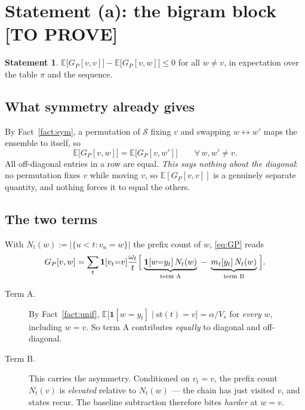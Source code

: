 \documentclass[11pt,a4paper]{article}
\theoremstyle{plain}
\theoremstyle{definition}
\newtheorem{statement}{Statement}
\newcommand{\TODO}{\textcolor{BrickRed}{\textbf{[TO PROVE]}}}
\newcommand{\Sig}{\mathcal{S}}
\newcommand{\1}{\mathbf{1}}
\newcommand{\E}{\mathbb{E}}
\begin{document}
\section{Statement (a): the bigram block \quad \TODO}\label{sec:a}

\begin{statement}\label{st:a}
$\E\bigl[G_P[v,v]\bigr]-\E\bigl[G_P[v,w]\bigr]\le 0$ for all $w\ne v$, in expectation over the
table $\pi$ and the sequence.
\end{statement}

\subsection{What symmetry already gives}

By Fact~\ref{fact:sym}, a permutation of $\Sig$ fixing $v$ and swapping $w\leftrightarrow w'$ maps
the ensemble to itself, so
\begin{equation}
\E\bigl[G_P[v,w]\bigr]=\E\bigl[G_P[v,w']\bigr]\qquad\forall\,w,w'\ne v .
\end{equation}
All off-diagonal entries in a row are equal. \emph{This says nothing about the diagonal}: no
permutation fixes $v$ while moving $v$, so $\E[G_P[v,v]]$ is a genuinely separate quantity, and
nothing forces it to equal the others.

\subsection{The two terms}

With $N_t(w):=\bigl|\{u<t:v_u=w\}\bigr|$ the prefix count of $w$, \eqref{eq:GP} reads
\begin{equation}
G_P[v,w]=\sum_t\1[v_t{=}v]\frac{\omega_t}{t}
\Bigl[\;\underbrace{\1[w{=}y_t]\,N_t(w)}_{\text{term A}}
\;-\;\underbrace{m_t[y_t]\,N_t(w)}_{\text{term B}}\;\Bigr].
\end{equation}

\begin{description}
\item[Term A.] By Fact~\ref{fact:unif},
$\E\bigl[\1[w{=}y_t]\mid\mathrm{st}(t)=v\bigr]=\alpha/V_s$ for \emph{every} $w$, including $w=v$.
So term A contributes \emph{equally} to diagonal and off-diagonal.
\item[Term B.] This carries the asymmetry. Conditioned on $v_t=v$, the prefix count $N_t(v)$ is
\emph{elevated} relative to $N_t(w)$ --- the chain has just visited $v$, and states recur. The
baseline subtraction therefore bites \emph{harder} at $w=v$.
\end{description}
\end{document}
